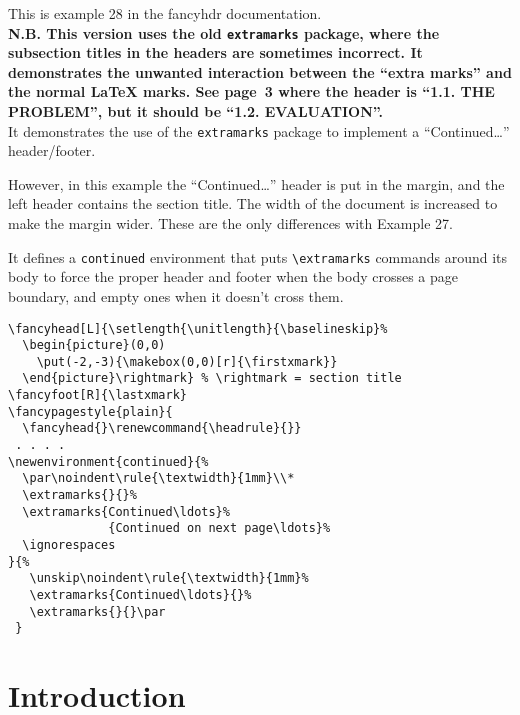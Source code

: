 \documentclass{report}
\begin{document}
\tableofcontents

\thispagestyle{plain}
\noindent
\begin{boxedminipage}{\textwidth}
This is example 28 in the fancyhdr documentation.
\\[1ex]
\textbf{N.B. This version uses the old \texttt{extramarks} package, where the subsection titles in the headers are sometimes incorrect. It demonstrates the unwanted interaction between the ``extra marks'' and the normal \LaTeX{} marks. See page~3 where the header is ``1.1. THE PROBLEM'', but it should be ``1.2. EVALUATION''.}
\\[1ex]
It demonstrates the use of the \texttt{extramarks} package to implement
a ``Continued\ldots'' header/footer.

However, in this example the ``Continued\ldots'' header is put in the margin, and the left header contains the section title. The width of the document is increased to make the margin wider. These are the only differences with Example 27.

It defines a \texttt{continued} environment that puts \verb|\extramarks| commands around its body to force the proper header and footer when the body crosses a page boundary, and empty ones when it doesn't cross them.

\begin{verbatim}
\fancyhead[L]{\setlength{\unitlength}{\baselineskip}%
  \begin{picture}(0,0)
    \put(-2,-3){\makebox(0,0)[r]{\firstxmark}}
  \end{picture}\rightmark} % \rightmark = section title
\fancyfoot[R]{\lastxmark}
\fancypagestyle{plain}{
  \fancyhead{}\renewcommand{\headrule}{}}
 . . . .
\newenvironment{continued}{%
  \par\noindent\rule{\textwidth}{1mm}\\*
  \extramarks{}{}%
  \extramarks{Continued\ldots}%
              {Continued on next page\ldots}%
  \ignorespaces
}{%
   \unskip\noindent\rule{\textwidth}{1mm}%
   \extramarks{Continued\ldots}{}%
   \extramarks{}{}\par
 }
\end{verbatim}

\end{boxedminipage}

\pagestyle{fancy}

\newpage
{}
\chapter{Introduction}
\end{document}
